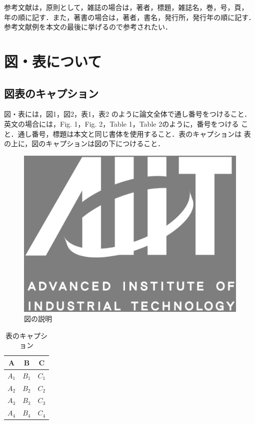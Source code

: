 \documentclass[a4j, 12Q, twocolumn, twoside]{jsarticle}
\begin{document}
参考文献は，原則として，雑誌の場合は，著者，標題，雑誌名，巻，号，頁，
年の順に記す．また，著書の場合は，著者，書名，発行所，発行年の順に記す．
参考文献例を本文の最後に挙げるので参考されたい．

\section{図・表について}
\subsection{図表のキャプション}
図・表には，図1，図2，表1，表2 のように論文全体で通し番号をつけること．
英文の場合には，Fig. 1，Fig. 2，Table 1，Table 2のように，番号をつける
こと．通し番号，標題は本文と同じ書体を使用すること．表のキャプションは
表の上に，図のキャプションは図の下につけること．

\begin{figure}
 \begin{center}
  \includegraphics[width=0.8\linewidth]{aiit_symbol.eps}
 \end{center}
 \caption{図の説明}
 \label{fig:one}
\end{figure}

\begin{table}
  \caption{表のキャプション}
  \begin{center}
    \begin{tabular}{|c|c|c|} \hline
    A & B & C \\ \hline
    $A_{1}$ & $B_{1}$ & $C_{1}$ \\ \hline
    $A_{2}$ & $B_{2}$ & $C_{2}$ \\ \hline
    $A_{3}$ & $B_{3}$ & $C_{3}$ \\ \hline
    $A_{4}$ & $B_{4}$ & $C_{4}$ \\ \hline
    \end{tabular}
  \end{center}
\end{table}
\end{document}
